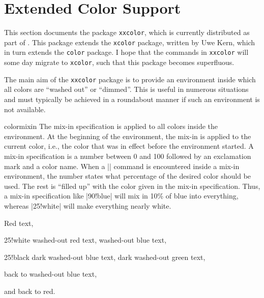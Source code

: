 %
%
%


\section[xxcolor]{Extended Color Support}

This section documents the package \texttt{xxcolor}, which is currently
distributed as part of \pgfname. This package extends the \texttt{xcolor}
package, written by Uwe Kern, which in turn extends the \texttt{color} package.
I hope that the commands in \texttt{xxcolor} will some day migrate to
\texttt{xcolor}, such that this package becomes superfluous.

The main aim of the \texttt{xxcolor} package is to provide an environment
inside which all colors are ``washed out'' or ``dimmed''. This is useful in
numerous situations and must typically be achieved in a roundabout manner if
such an environment is not available.

\begin{environment}{{colormixin}}
    The mix-in specification is applied to all colors inside the environment.
    At the beginning of the environment, the mix-in is applied to the current
    color, i.e., the color that was in effect before the environment started.
    A mix-in specification is a number between 0 and 100 followed by an
    exclamation mark and a color name. When a |\color| command is encountered
    inside a mix-in environment, the number states what percentage of the
    desired color should be used. The rest is ``filled up'' with the color
    given in the mix-in specification. Thus, a mix-in specification like
    |90!blue| will mix in 10\% of blue into everything, whereas |25!white| will
    make everything nearly white.
\begin{codeexample}[width=4cm,preamble={\usepackage{xxcolor}},pre={\begin{lateximage}},post={\end{lateximage}}]
\begin{minipage}{3.5cm}\raggedright
\color{red}Red text,%
\begin{colormixin}{25!white}
  washed-out red text,
  \color{blue} washed-out blue text,
  \begin{colormixin}{25!black}
    dark washed-out blue text,
    \color{green} dark washed-out green text,%
  \end{colormixin}
  back to washed-out blue text,%
\end{colormixin}
and back to red.
\end{minipage}%
\end{codeexample}
\end{environment}

